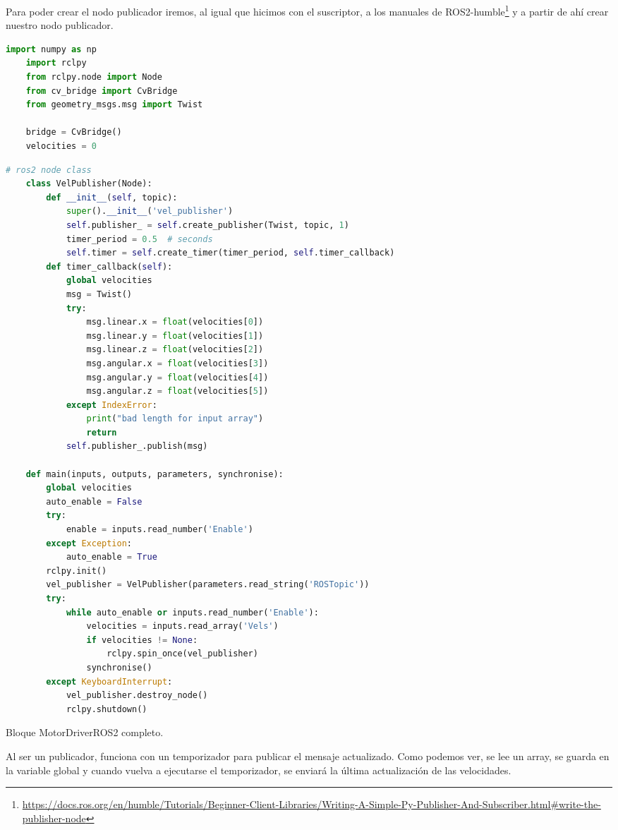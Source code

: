 Para poder crear el nodo publicador iremos, al igual que hicimos con el suscriptor, a los manuales de ROS2-humble\footnote{\url{https://docs.ros.org/en/humble/Tutorials/Beginner-Client-Libraries/Writing-A-Simple-Py-Publisher-And-Subscriber.html\#write-the-publisher-node}} y a partir de ahí crear nuestro nodo publicador.













\begin{code}[H]
  \begin{lstlisting}[language=python]
    import numpy as np
    import rclpy
    from rclpy.node import Node
    from cv_bridge import CvBridge
    from geometry_msgs.msg import Twist

    bridge = CvBridge()
    velocities = 0

  \end{lstlisting}
\end{code}
\begin{code}[H]
  \begin{lstlisting}[language=python]
    # ros2 node class
    class VelPublisher(Node):
        def __init__(self, topic):
            super().__init__('vel_publisher')
            self.publisher_ = self.create_publisher(Twist, topic, 1)
            timer_period = 0.5  # seconds
            self.timer = self.create_timer(timer_period, self.timer_callback)
        def timer_callback(self):
            global velocities
            msg = Twist()
            try:
                msg.linear.x = float(velocities[0])
                msg.linear.y = float(velocities[1])
                msg.linear.z = float(velocities[2])
                msg.angular.x = float(velocities[3])
                msg.angular.y = float(velocities[4])
                msg.angular.z = float(velocities[5])
            except IndexError:
                print("bad length for input array")
                return
            self.publisher_.publish(msg)

    def main(inputs, outputs, parameters, synchronise):
        global velocities
        auto_enable = False
        try:
            enable = inputs.read_number('Enable')
        except Exception:
            auto_enable = True
        rclpy.init()
        vel_publisher = VelPublisher(parameters.read_string('ROSTopic'))
        try:
            while auto_enable or inputs.read_number('Enable'):
                velocities = inputs.read_array('Vels')
                if velocities != None:
                    rclpy.spin_once(vel_publisher) 
                synchronise()   
        except KeyboardInterrupt:
            vel_publisher.destroy_node()
            rclpy.shutdown()
  \end{lstlisting}
  \caption[Bloque MotorDriverROS2]{Bloque MotorDriverROS2 completo.}
  \label{cod:motordriverros2_all}
\end{code}

Al ser un publicador, funciona con un temporizador para publicar el mensaje actualizado. Como podemos ver, se lee un array, se guarda en la variable global y cuando vuelva a ejecutarse el temporizador, se enviará la última actualización de las velocidades.













